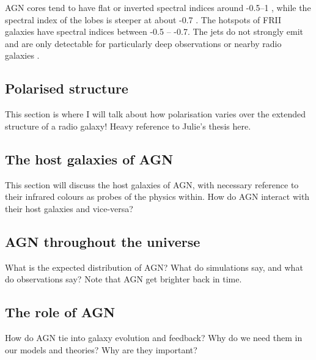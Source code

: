         AGN cores tend to have flat or inverted spectral indices around -0.5--1 \citeneeded, while the spectral index of the lobes is steeper at about -0.7 \citeneeded. The hotspots of FRII galaxies have spectral indices between -0.5 -- -0.7. The jets do not strongly emit and are only detectable for particularly deep observations or nearby radio galaxies \citeneeded.

    \subsection{Polarised structure}
    \label{sec:polarised-structure-of-agn}

        This section is where I will talk about how polarisation varies over the extended structure of a radio galaxy! Heavy reference to Julie's thesis here.

    \subsection{The host galaxies of AGN}
    \label{sec:host-galaxies}

        This section will discuss the host galaxies of AGN, with necessary reference to their infrared colours as probes of the physics within. How do AGN interact with their host galaxies and vice-versa?

    \subsection{AGN throughout the universe}
    \label{sec:agn-throughout-the-universe}

        What is the expected distribution of AGN? What do simulations say, and what do observations say? Note that AGN get brighter back in time.

    \subsection{The role of AGN}
    \label{sec:role-of-agn}

        How do AGN tie into galaxy evolution and feedback? Why do we need them in our models and theories? Why are they important?




